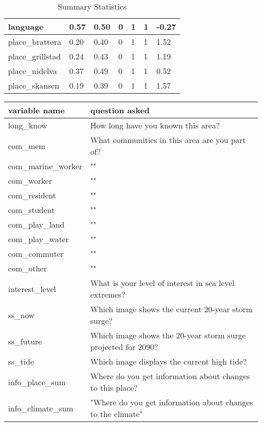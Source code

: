 \begin{center}
\begin{table}[H]
\begin{tabular}{|l|l|l|l|l|l|l|}
        language & 0.57 & 0.50 & 0 & 1 & 1 & -0.27  \\ \hline
        place\_brattøra & 0.20 & 0.40 & 0 & 1 & 1 & 1.52  \\ \hline
        place\_grillstad & 0.24 & 0.43 & 0 & 1 & 1 & 1.19 \\ \hline
        place\_nidelva & 0.37 & 0.49 & 0 & 1 & 1 & 0.52 \\ \hline
        place\_skansen & 0.19 & 0.39 & 0 & 1 & 1 & 1.57 \\ \hline
    \end{tabular}
    \caption{Summary Statistics}
\label{table:summary_stats}
\end{table}
\end{center}


\begin{center}
\begin{table}[H]
    \centering
    \begin{tabular}{|l|l|}
    \hline
        variable name  & question asked \\ \hline
        long\_know & How long have you known this area? \\ \hline
        com\_mem  & What communities in this area are you part of? \\ \hline
        com\_marine\_worker & "" \\ \hline
        com\_worker & "" \\ \hline
        com\_resident & "" \\ \hline
        com\_student & "" \\ \hline
        com\_play\_land & "" \\ \hline
        com\_play\_water &  "" \\ \hline
        com\_commuter &  "" \\ \hline
        com\_other &  "" \\ \hline
        interest\_level & What is your level of interest in sea level extremes? \\ \hline
        ss\_now  & Which image shows the current 20-year storm surge? \\ \hline
        ss\_future  & Which image shows the 20-year storm surge projected for 2090? \\ \hline
        ss\_tide  & Which image displays the current high tide? \\ \hline
        info\_place\_sum & Where do you get information about changes to this place? \\ \hline
        info\_climate\_sum &  "Where do you get information about changes to the climate" \\ \hline

\end{tabular}
\end{table}
\end{center}
